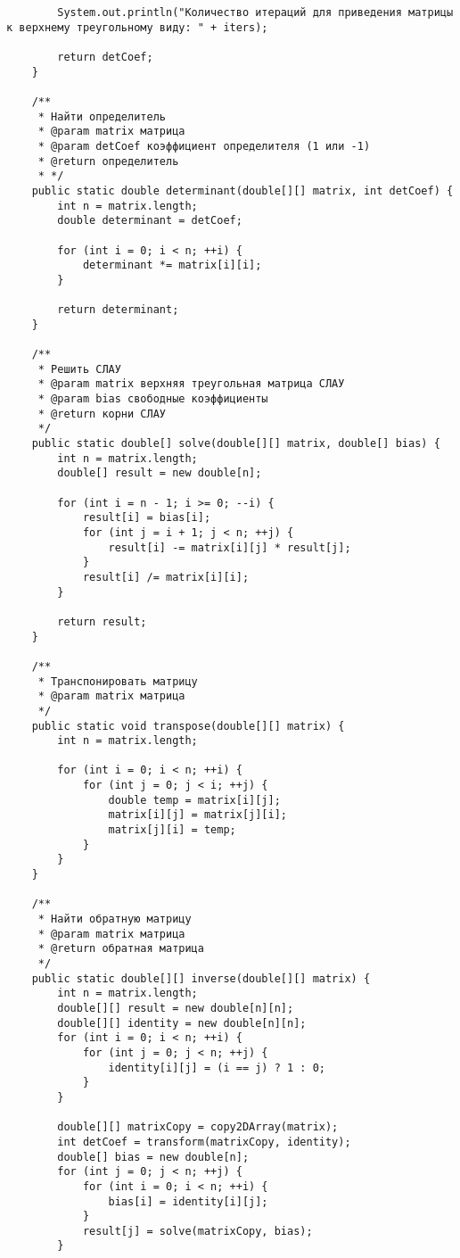 \begin{verbatim}
        System.out.println("Количество итераций для приведения матрицы к верхнему треугольному виду: " + iters);

        return detCoef;
    }

    /**
     * Найти определитель
     * @param matrix матрица
     * @param detCoef коэффициент определителя (1 или -1)
     * @return определитель
     * */
    public static double determinant(double[][] matrix, int detCoef) {
        int n = matrix.length;
        double determinant = detCoef;

        for (int i = 0; i < n; ++i) {
            determinant *= matrix[i][i];
        }

        return determinant;
    }

    /**
     * Решить СЛАУ
     * @param matrix верхняя треугольная матрица СЛАУ
     * @param bias свободные коэффициенты
     * @return корни СЛАУ
     */
    public static double[] solve(double[][] matrix, double[] bias) {
        int n = matrix.length;
        double[] result = new double[n];

        for (int i = n - 1; i >= 0; --i) {
            result[i] = bias[i];
            for (int j = i + 1; j < n; ++j) {
                result[i] -= matrix[i][j] * result[j];
            }
            result[i] /= matrix[i][i];
        }

        return result;
    }

    /**
     * Транспонировать матрицу
     * @param matrix матрица
     */
    public static void transpose(double[][] matrix) {
        int n = matrix.length;

        for (int i = 0; i < n; ++i) {
            for (int j = 0; j < i; ++j) {
                double temp = matrix[i][j];
                matrix[i][j] = matrix[j][i];
                matrix[j][i] = temp;
            }
        }
    }

    /**
     * Найти обратную матрицу
     * @param matrix матрица
     * @return обратная матрица
     */
    public static double[][] inverse(double[][] matrix) {
        int n = matrix.length;
        double[][] result = new double[n][n];
        double[][] identity = new double[n][n];
        for (int i = 0; i < n; ++i) {
            for (int j = 0; j < n; ++j) {
                identity[i][j] = (i == j) ? 1 : 0;
            }
        }

        double[][] matrixCopy = copy2DArray(matrix);
        int detCoef = transform(matrixCopy, identity);
        double[] bias = new double[n];
        for (int j = 0; j < n; ++j) {
            for (int i = 0; i < n; ++i) {
                bias[i] = identity[i][j];
            }
            result[j] = solve(matrixCopy, bias);
        }


\end{verbatim}
